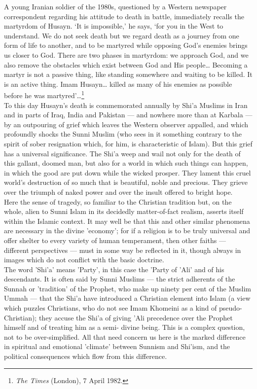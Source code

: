 \documentclass[10pt, twoside]{book}
\begin{document}
A young Iranian soldier of the 1980s, questioned by a Western newspaper correspondent regarding his 
attitude to death in battle, immediately recalls the martyrdom of Husayn. `It is impossible,' he 
says, `for you in the West to understand. We do not seek death but we regard death as a journey from 
one form of life to another, and to be martyred while opposing God's enemies brings us closer to God. 
There are two phases in martyrdom: we approach God, and we also remove the obstacles which exist 
between God and His people\ldots{} Becoming a martyr is not a passive thing, like standing somewhere and 
waiting to be killed. It is an active thing. Imam Husayn\ldots{} killed as many of his enemies as possible 
before he was martyred'\ldots{}\footnote{\emph{The Times} (London), 7 April 1982.}\\

To this day Husayn's death is commemorated annually by Shi'a Muslims in Iran and in parts of Iraq, 
India and Pakistan --- and nowhere more than at Karbala --- by an outpouring of grief which leaves the 
Western observer appalled, and which profoundly shocks the Sunni Muslim (who sees in it something 
contrary to the spirit of sober resignation which, for him, is characteristic of Islam). But this 
grief has a universal significance. The Shi'a weep and wail not only for the death of this gallant, 
doomed man, but also for a world in which such things can happen, in which the good are put down 
while the wicked prosper. They lament this cruel world's destruction of so much that is beautiful, 
noble and precious. They grieve over the triumph of naked power and over the insult offered to bright 
hope. \\

Here the sense of tragedy, so familiar to the Christian tradition but, on the whole, alien to Sunni 
Islam in its decidedly matter\hyp{}of\hyp{}fact realism, asserts itself within the Islamic context. It may well 
be that this and other similar phenomena are necessary in the divine 'economy'; for if a religion is 
to be truly universal and offer shelter to every variety of human temperament, then other faiths --- 
different perspectives --- must in some way be reflected in it, though always in images which do not 
conflict with the basic doctrine. \\

The word 'Shi'a' means 'Party', in this case the 'Party of 'Ali' and of his descendants. It is often 
said by Sunni Muslims --- the strict adherents of the Sunnah or 'tradition' of the Prophet, who make up 
ninety per cent of the Muslim Ummah --- that the Shi'a have introduced a Christian element into Islam 
(a view which puzzles Christians, who do not see Imam Khomeini as a kind of pseudo\hyp{}Christian); they 
accuse the Shi'a of giving 'Ali precedence over the Prophet himself and of treating him as a semi\hyp{}
divine being. This is a complex question, not to be over\hyp{}simplified. All that need concern us here is 
the marked difference in spiritual and emotional 'climate' between Sunnism and Shi'ism, and the 
political consequences which flow from this difference. \\
\end{document}
